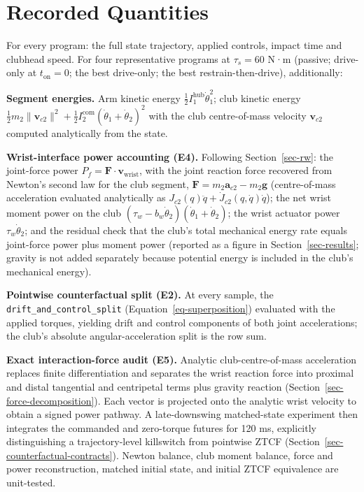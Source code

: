 \documentclass[
  letterpaper,
]{report}
\begin{document}
\section{Recorded Quantities}\label{sec-methods-quantities}

For every program: the full state trajectory, applied controls, impact
time and clubhead speed. For four representative programs at
\(\tau_s = 60\) N·m (passive; drive-only at \(t_{\mathrm{on}}=0\); the
best drive-only; the best restrain-then-drive), additionally:

\textbf{Segment energies.} Arm kinetic energy
\(\tfrac12 I_1^{\mathrm{hub}}\dot\theta_1^2\); club kinetic energy
\(\tfrac12 m_2 \lVert \mathbf v_{c2} \rVert^2 + \tfrac12 I_2^{\mathrm{com}}
(\dot\theta_1+\dot\theta_2)^2\) with the club centre-of-mass velocity
\(\mathbf v_{c2}\) computed analytically from the state.

\textbf{Wrist-interface power accounting (E4).} Following
Section~\ref{sec-rw}: the joint-force power
\(P_f = \mathbf F \cdot \mathbf v_{\mathrm{wrist}}\), with the joint
reaction force recovered from Newton's second law for the club segment,
\(\mathbf F = m_2 \mathbf a_{c2} - m_2 \mathbf g\) (centre-of-mass
acceleration evaluated analytically as
\(J_{c2}(q)\ddot q+\dot J_{c2}(q,\dot q)\dot q\)); the net wrist moment
power on the club
\((\tau_w - b_w\dot\theta_2)(\dot\theta_1+\dot\theta_2)\); the wrist
actuator power \(\tau_w \dot\theta_2\); and the residual check that the
club's total mechanical energy rate equals joint-force power plus moment
power (reported as a figure in Section~\ref{sec-results}; gravity is not
added separately because potential energy is included in the club's
mechanical energy).

\textbf{Pointwise counterfactual split (E2).} At every sample, the
\texttt{drift\_and\_control\_split} (Equation~\ref{eq-superposition})
evaluated with the applied torques, yielding drift and control
components of both joint accelerations; the club's absolute
angular-acceleration split is the row sum.

\textbf{Exact interaction-force audit (E5).} Analytic
club-centre-of-mass acceleration replaces finite differentiation and
separates the wrist reaction force into proximal and distal tangential
and centripetal terms plus gravity reaction
(Section~\ref{sec-force-decomposition}). Each vector is projected onto
the analytic wrist velocity to obtain a signed power pathway. A
late-downswing matched-state experiment then integrates the commanded
and zero-torque futures for 120 ms, explicitly distinguishing a
trajectory-level killswitch from pointwise ZTCF
(Section~\ref{sec-counterfactual-contracts}). Newton balance, club
moment balance, force and power reconstruction, matched initial state,
and initial ZTCF equivalence are unit-tested.
\end{document}
